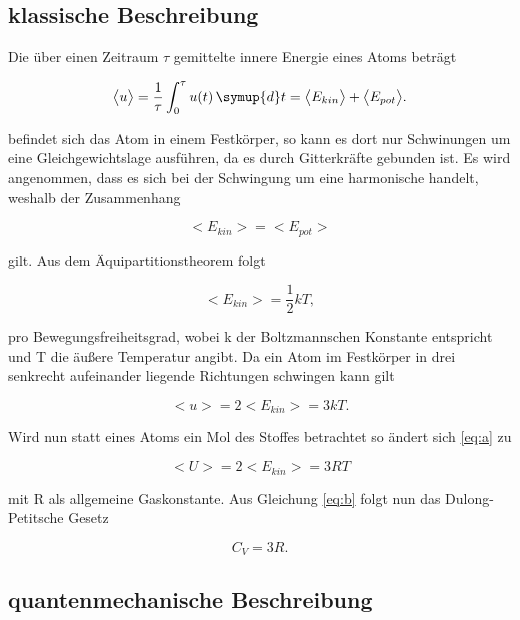 \subsection{klassische Beschreibung}
Die über einen Zeitraum $\tau$ gemittelte innere 
Energie eines Atoms beträgt

\begin{equation}
    \bigl< u\bigr>=\frac{1}{\tau}\int_0^{\tau}u(t)\,\symup{d}t=\bigl< E_{kin}\bigr>+\bigl< E_{pot}\bigr>.
\end{equation}

\noindent befindet sich das Atom in einem Festkörper,
so kann es dort nur Schwinungen um eine Gleichgewichtslage 
ausführen, da es durch Gitterkräfte gebunden ist. Es
wird angenommen, dass es sich bei der Schwingung um eine
harmonische handelt, weshalb der Zusammenhang

\begin{equation}
    \bigl< E_{kin}\bigr>=\bigl< E_{pot}\bigr>
\end{equation}

\noindent gilt. Aus dem Äquipartitionstheorem folgt

\begin{equation}
    \bigl< E_{kin}\bigr>=\frac{1}{2}kT,
\end{equation}

\noindent pro Bewegungsfreiheitsgrad, wobei k der Boltzmannschen Konstante
entspricht und T die äußere Temperatur angibt. Da ein Atom im Festkörper in drei senkrecht aufeinander liegende
Richtungen schwingen kann gilt

\begin{equation}
    \bigl< u\bigr>=2\bigl< E_{kin}\bigr>=3kT.
    \label{eq:a}
\end{equation}

\noindent Wird nun statt eines Atoms ein Mol des Stoffes
betrachtet so ändert sich \ref{eq:a} zu

\begin{equation}
    \bigl< U\bigr>=2\bigl< E_{kin}\bigr>=3RT
\end{equation}

\noindent mit R als allgemeine Gaskonstante. Aus Gleichung \ref{eq:b}
folgt nun das Dulong-Petitsche Gesetz

\begin{equation}
    C_V=3R.
\end{equation}

\subsection{quantenmechanische Beschreibung}